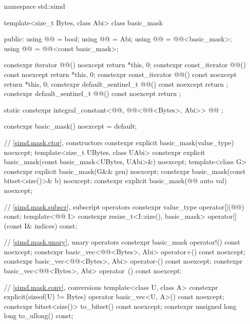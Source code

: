 \begin{codeblock}
namespace std::simd {
  template<size_t Bytes, class Abi> class basic_mask {
  public:
    using @@ = bool;
    using @@ = Abi;
    using @@ = @@<basic_mask>;
    using @@ = @@<const basic_mask>;

    constexpr iterator @@() noexcept { return {*this, 0}; }
    constexpr const_iterator @@() const noexcept { return {*this, 0}; }
    constexpr const_iterator @@() const noexcept { return {*this, 0}; }
    constexpr default_sentinel_t @@() const noexcept { return {}; }
    constexpr default_sentinel_t @@() const noexcept { return {}; }

    static constexpr integral_constant<@@, @@<@@<Bytes>, Abi>>
      @@ {};

    constexpr basic_mask() noexcept = default;

    // \ref{simd.mask.ctor},  constructors
    constexpr explicit basic_mask(value_type) noexcept;
    template<size_t UBytes, class UAbi>
      constexpr explicit basic_mask(const basic_mask<UBytes, UAbi>&) noexcept;
    template<class G>
      constexpr explicit basic_mask(G&& gen) noexcept;
    constexpr basic_mask(const bitset<size()>& b) noexcept;
    constexpr explicit basic_mask(@@ auto val) noexcept;

    // \ref{simd.mask.subscr},  subscript operators
    constexpr value_type operator[](@@) const;
    template<@@ I>
      constexpr resize_t<I::size(), basic_mask> operator[](const I& indices) const;

    // \ref{simd.mask.unary},  unary operators
    constexpr basic_mask operator!() const noexcept;
    constexpr basic_vec<@@<Bytes>, Abi> operator+() const noexcept;
    constexpr basic_vec<@@<Bytes>, Abi> operator-() const noexcept;
    constexpr basic_vec<@@<Bytes>, Abi> operator~() const noexcept;

    // \ref{simd.mask.conv},  conversions
    template<class U, class A>
      constexpr explicit(sizeof(U) != Bytes) operator basic_vec<U, A>() const noexcept;
    constexpr bitset<size()> to_bitset() const noexcept;
    constexpr unsigned long long to_ullong() const;

}}
\end{codeblock}
